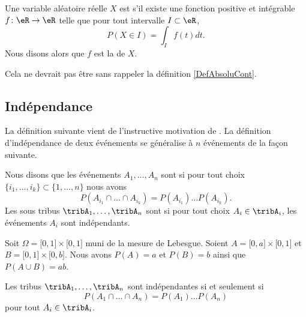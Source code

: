 \begin{definition}
    Une variable aléatoire réelle \( X\) est  s'il existe une fonction positive et intégrable \( f\colon \eR\to \eR\) telle que pour tout intervalle \( I\subset\eR\),
    \begin{equation}
        P(X\in I)=\int_If(t)dt.
    \end{equation}
    Nous disons alors que \( f\) est la  de \( X\).
\end{definition}
Cela ne devrait pas être sans rappeler la définition \ref{DefAbsoluCont}.

\subsection{Indépendance}

La définition suivante vient de l'instructive motivation de \cite{CourgGudRennes}. La définition d'indépendance de deux événements se généralise à \( n\) événements de la façon suivante.
\begin{definition}
    Nous disons que les événements \( A_1,\ldots,A_n\) sont  si pour tout choix \( \{ i_1,\ldots,i_k \}\subset\{ 1,\ldots,n \}\) nous avons
    \begin{equation}
        P(A_{i_1}\cap\ldots\cap A_{i_k})=P(A_{i_1})\ldots P(A_{i_k}).
    \end{equation}
    Les sous tribus \( \tribA_1,\ldots,\tribA_n\) sont  si pour tout choix \( A_i\in \tribA_i\), les événements \( A_i\) sont indépendants.
\end{definition}

\begin{example}
    Soit \( \Omega=\mathopen[ 0 , 1 \mathclose]\times \mathopen[ 0 , 1 \mathclose]\) muni de la mesure de Lebesgue. Soient \( A=\mathopen[ 0 , a \mathclose]\times \mathopen[ 0 , 1 \mathclose]\) et \( B=\mathopen[ 0 , 1 \mathclose]\times \mathopen[ 0 , b \mathclose]\). Nous avons \( P(A)=a\) et \( P(B)=b\) ainsi que \( P(A\cup B)=ab\).
\end{example}

\begin{lemma}       \label{LemTribIndepProdProb}
    Les tribus \( \tribA_1,\ldots,\tribA_n\) sont indépendantes si et seulement si
    \begin{equation}
        P(A_1\cap\ldots\cap A_n)=P(A_1)\ldots P(A_n)
    \end{equation}
    pour tout \( A_i\in\tribA_i\).
\end{lemma}

